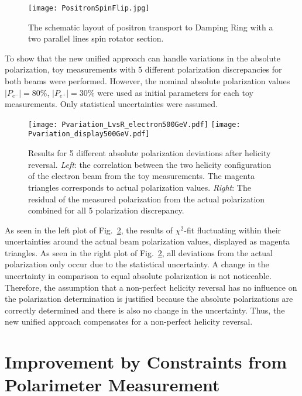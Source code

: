 \documentclass[a4paper]{article}
\begin{document}
\begin{figure}[htb]
\centering
\texttt{[image: PositronSpinFlip.jpg]}
\caption{The schematic layout of positron transport to Damping Ring with a two parallel lines spin rotator section.\cite{positronflip}}
\label{fig:positronflip}
\end{figure}

To show that the new unified approach can handle variations in the absolute polarization, toy measurements with 5 different polarization discrepancies for both beams were performed. However, the nominal absolute polarization values $\left|P_{e^{-}}\right| = 80\%$, $\left|P_{e^{+}}\right| = 30\%$ were used as initial parameters for each toy measurements. Only statistical uncertainties were assumed.

\begin{figure}[htb]
\centering
\texttt{[image: Pvariation\_LvsR\_electron500GeV.pdf]}
\texttt{[image: Pvariation\_display500GeV.pdf]}
\caption{Results for 5 different absolute polarization deviations after helicity reversal. \textit{Left}: the correlation between the two helicity configuration of the electron beam from the toy measurements. The magenta triangles corresponds to actual polarization values. \textit{Right}: The residual of the measured polarization from the actual polarization combined for all 5 polarization discrepancy.}
\label{fig:nonperfecthelicityreversal}
\end{figure}

As seen in the left plot of Fig.~\ref{fig:nonperfecthelicityreversal}, the results of $\chi^{2}$-fit fluctuating within their uncertainties around the actual beam polarization values, displayed as magenta triangles. As seen in the right plot of Fig.~\ref{fig:nonperfecthelicityreversal}, all deviations from the actual polarization only occur due to the statistical uncertainty. A change in the uncertainty in comparison to equal absolute polarization is not noticeable. Therefore, the assumption that a non-perfect helicity reversal has no influence on the polarization determination is justified because the absolute polarizations are correctly determined and there is also no change in the uncertainty. Thus, the new unified approach compensates for a non-perfect helicity reversal.\\




\section{Improvement by Constraints from Polarimeter Measurement}
\label{sec:polarimeterconstraint}
\end{document}
